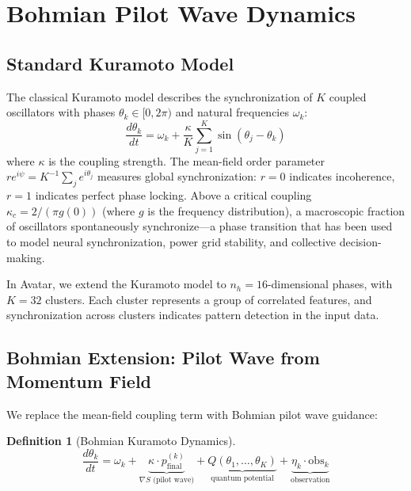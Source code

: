 \documentclass[11pt,a4paper,twocolumn]{article}
\newtheorem{definition}{Definition}
\begin{document}
\section{Bohmian Pilot Wave Dynamics}

\subsection{Standard Kuramoto Model}

The classical Kuramoto model describes the synchronization of $K$ coupled oscillators with phases $\theta_k \in [0, 2\pi)$ and natural frequencies $\omega_k$:
\begin{equation}
\frac{d\theta_k}{dt} = \omega_k + \frac{\kappa}{K} \sum_{j=1}^{K} \sin(\theta_j - \theta_k)
\label{eq:kuramoto_classic}
\end{equation}
where $\kappa$ is the coupling strength.
The mean-field order parameter $r e^{i\psi} = K^{-1} \sum_j e^{i\theta_j}$ measures global synchronization: $r = 0$ indicates incoherence, $r = 1$ indicates perfect phase locking.
Above a critical coupling $\kappa_c = 2/(\pi g(0))$ (where $g$ is the frequency distribution), a macroscopic fraction of oscillators spontaneously synchronize---a phase transition that has been used to model neural synchronization, power grid stability, and collective decision-making.

In Avatar, we extend the Kuramoto model to $n_h = 16$-dimensional phases, with $K = 32$ clusters.
Each cluster represents a group of correlated features, and synchronization across clusters indicates pattern detection in the input data.

\subsection{Bohmian Extension: Pilot Wave from Momentum Field}

We replace the mean-field coupling term with Bohmian pilot wave guidance:
\begin{definition}[Bohmian Kuramoto Dynamics]
\begin{equation}
\frac{d\theta_k}{dt} = \omega_k + \underbrace{\kappa \cdot p_{\mathrm{final}}^{(k)}}_{\nabla S \text{ (pilot wave)}} + \underbrace{Q(\theta_1, \ldots, \theta_K)}_{\text{quantum potential}} + \underbrace{\eta_k \cdot \mathrm{obs}_k}_{\text{observation}}
\label{eq:bohmian_kuramoto}
\end{equation}
\end{definition}
\end{document}
